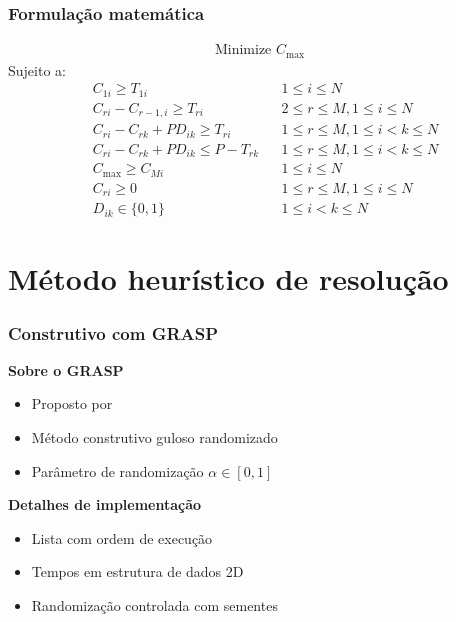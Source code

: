 \documentclass[professionalfonts]{beamer}
\begin{document}
\begin{frame}
   \frametitle{Formulação matemática}

   \begin{align}
      \text{Minimize } C_\mathrm{max} \label{pfsp:obj}
   \end{align}
   Sujeito a:
   \begin{align}
      & C_{1i} \geqslant T_{1i} & & 1 \leqslant i \leqslant N \label{pfsp:complM0} \\
      & C_{ri} - C_{r-1,i} \geqslant T_{ri} & & 2 \leqslant r \leqslant M, 
         1 \leqslant i \leqslant N \label{pfsp:complM} \\
      & C_{ri} - C_{rk} + PD_{ik} \geqslant T_{ri} & & 1 \leqslant r \leqslant M, 
         1 \leqslant i < k \leqslant N \label{pfsp:jobSeqA}\\
      & C_{ri} - C_{rk} + PD_{ik} \leqslant P - T_{rk} & & 1 \leqslant r \leqslant M, 
         1 \leqslant i < k \leqslant N \label{pfsp:jobSeqB} \\
      & C_\mathrm{max} \geqslant C_{Mi} & & 1 \leqslant i \leqslant N \label{pfsp:makespan} \\
      & C_{ri} \geqslant 0 & & 1 \leqslant r \leqslant M, 1 \leqslant i \leqslant N \label{pfsp:Cdom}\\
      & D_{ik} \in \{0,1\} & & 1 \leqslant i < k \leqslant N \label{pfsp:Ddom}
   \end{align}
\end{frame}

\section{Método heurístico de resolução}

\begin{frame}
   \frametitle{Construtivo com GRASP}

   \textbf{Sobre o GRASP}
   \begin{itemize}
      \item Proposto por \cite{feo1994-grasp}
      \item Método construtivo guloso randomizado
      \item Parâmetro de randomização $\alpha \in [0,1]$
   \end{itemize}

   \medskip
   \textbf{Detalhes de implementação}
   \begin{itemize}
      \item Lista com ordem de execução
      \item Tempos em estrutura de dados 2D 
      \item Randomização controlada com sementes
   \end{itemize}
\end{frame}
\end{document}
